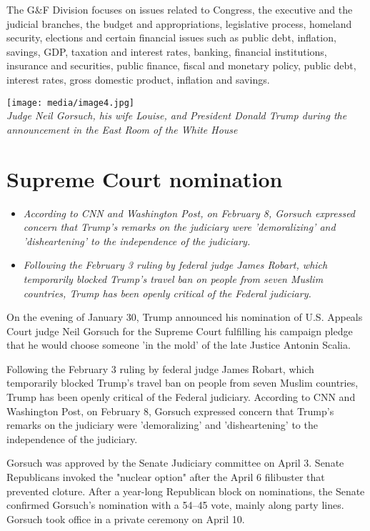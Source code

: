 The G\&F Division focuses on issues related to Congress, the executive
and the judicial branches, the budget and appropriations, legislative
process, homeland security, elections and certain financial issues such
as public debt, inflation, savings, GDP, taxation and interest rates,
banking, financial institutions, insurance and securities, public
finance, fiscal and monetary policy, public debt, interest rates, gross
domestic product, inflation and savings.

\texttt{[image: media/image4.jpg]}\\
\emph{Judge Neil Gorsuch, his wife Louise, and President Donald Trump
during the announcement in the East Room of the White House}

\section{Supreme Court nomination}\label{supreme-court-nomination}

\begin{itemize}
\item
  \emph{According to CNN and Washington Post, on February 8, Gorsuch
  expressed concern that Trump's remarks on the judiciary were
  'demoralizing' and 'disheartening' to the independence of the
  judiciary.}
\item
  \emph{Following the February 3 ruling by federal judge James Robart,
  which temporarily blocked Trump's travel ban on people from seven
  Muslim countries, Trump has been openly critical of the Federal
  judiciary.}
\end{itemize}

On the evening of January 30, Trump announced his nomination of U.S.
Appeals Court judge Neil Gorsuch for the Supreme Court fulfilling his
campaign pledge that he would choose someone 'in the mold' of the late
Justice Antonin Scalia.

Following the February 3 ruling by federal judge James Robart, which
temporarily blocked Trump's travel ban on people from seven Muslim
countries, Trump has been openly critical of the Federal judiciary.
According to CNN and Washington Post, on February 8, Gorsuch expressed
concern that Trump's remarks on the judiciary were 'demoralizing' and
'disheartening' to the independence of the judiciary.

Gorsuch was approved by the Senate Judiciary committee on April 3.
Senate Republicans invoked the "nuclear option" after the April 6
filibuster that prevented cloture. After a year-long Republican block on
nominations, the Senate confirmed Gorsuch's nomination with a 54--45
vote, mainly along party lines. Gorsuch took office in a private
ceremony on April 10.


